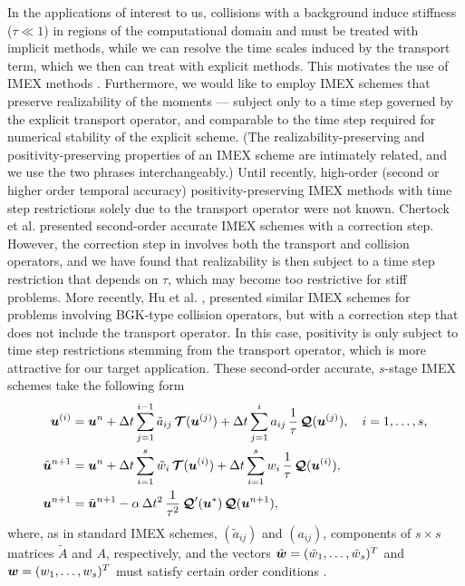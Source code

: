 In the applications of interest to us, collisions with a background induce stiffness ($\tau\ll1$) in regions of the computational domain and must be treated with implicit methods, while we can resolve the time scales induced by the transport term, which we then can treat with explicit methods.  
This motivates the use of IMEX methods \cite{ascher_etal_1997,pareschiRusso_2005}.  
Furthermore, we would like to employ IMEX schemes that preserve realizability of the moments --- subject only to a time step governed by the explicit transport operator, and comparable to the time step required for numerical stability of the explicit scheme.  
(The realizability-preserving and positivity-preserving properties of an IMEX scheme are intimately related, and we use the two phrases interchangeably.)  
Until recently, high-order (second or higher order temporal accuracy) positivity-preserving IMEX methods with time step restrictions solely due to the transport operator were not known.  
Chertock et al. \cite{chertock_etal_2015} presented second-order accurate IMEX schemes with a correction step.  
However, the correction step in \cite{chertock_etal_2015} involves both the transport and collision operators, and we have found that realizability is then subject to a time step restriction that depends on $\tau$, which may become too restrictive for stiff problems.  
More recently, Hu et al. \cite{hu_etal_2018}, presented similar IMEX schemes for problems involving BGK-type collision operators, but with a correction step that does not include the transport operator.  
In this case, positivity is only subject to time step restrictions stemming from the transport operator, which is more attractive for our target application.  
These second-order accurate, $s$-stage IMEX schemes take the following form \cite{hu_etal_2018}
\begin{align}
  \boldsymbol{u}^{(i)}
  &=\boldsymbol{u}^{n}
  +\Delta t\sum_{j=1}^{i-1}\tilde{a}_{ij}\,\boldsymbol{\mathcal{T}}(\boldsymbol{u}^{(j)})
  +\Delta t\sum_{j=1}^{i}a_{ij}\,\frac{1}{\tau}\,\boldsymbol{\mathcal{Q}}(\boldsymbol{u}^{(j)}),
  \quad i=1,\ldots,s, \label{imexStages} \\
  \tilde{\boldsymbol{u}}^{n+1}
  &=\boldsymbol{u}^{n}
  +\Delta t\sum_{i=1}^{s}\tilde{w}_{i}\,\boldsymbol{\mathcal{T}}(\boldsymbol{u}^{(i)})
  +\Delta t\sum_{i=1}^{s}w_{i}\,\frac{1}{\tau}\,\boldsymbol{\mathcal{Q}}(\boldsymbol{u}^{(i)}), \label{imexIntermediate} \\
  \boldsymbol{u}^{n+1}
  &=\tilde{\boldsymbol{u}}^{n+1}-\alpha\,\Delta t^{2}\,\frac{1}{\tau^{2}}\,\boldsymbol{\mathcal{Q}}'(\boldsymbol{u}^{*})\,\boldsymbol{\mathcal{Q}}(\boldsymbol{u}^{n+1}), \label{eq:imexCorrection}
\end{align}
where, as in standard IMEX schemes, $(\tilde{a}_{ij})$ and $(a_{ij})$, components of $s\times s$ matrices $\tilde{A}$ and $A$, respectively, and the vectors $\tilde{\boldsymbol{w}}=(\tilde{w}_{1},\ldots,\tilde{w}_{s})^{T}$ and $\boldsymbol{w}=(w_{1},\ldots,w_{s})^{T}$ must satisfy certain order conditions \cite{pareschiRusso_2005}.  
